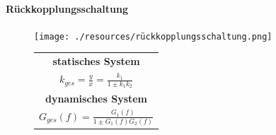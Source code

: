 \documentclass[12pt,a4paper]{article}
\begin{document}
\paragraph{Rückkopplungsschaltung}
\hspace{1pt}

\begin{minipage}{\linewidth}
\centering
\begin{minipage}{0.45\linewidth}
\begin{figure}[H]
\texttt{[image: ./resources/rückkopplungsschaltung.png]}
\end{figure}
\end{minipage}
\hspace{0.05\linewidth}
\begin{minipage}{0.45\linewidth}
\begin{figure}[H]
\begin{tabular}{|c|}
\hline
\textbf{statisches System}\\
$\displaystyle k_{ges} = \frac{y}{x} = \frac{k_1}{1 \pm k_1 k_2}$\\
\hline
\textbf{dynamisches System}\\
$\displaystyle G_{ges}(f) = \frac{G_1(f)}{1 \pm G_1(f)G_2(f)}$\\
\hline
\end{tabular}
\end{figure}
\end{minipage}
\end{minipage}
\end{document}
